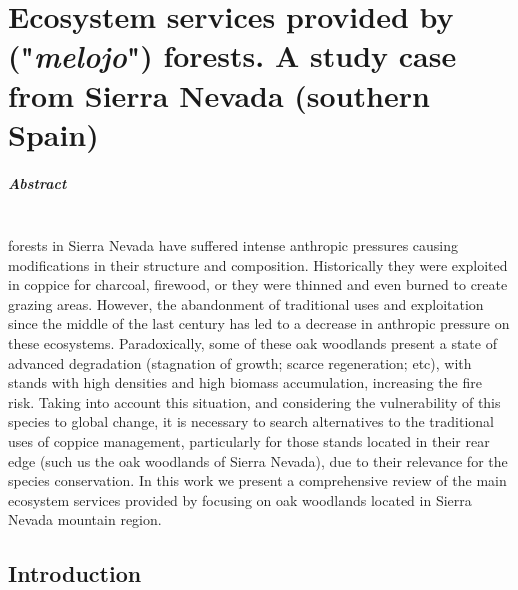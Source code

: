 %
\chapter{\textcolor{ctcolormain}{Ecosystem services provided by \Qpw ("\textit{melojo}") forests}. A study case from Sierra Nevada (southern Spain)}\label{sec:es}

\mbox{}
\vfill


\newpage

\paragraph{Abstract} \mbox{} \\
\Qp forests in Sierra Nevada have suffered intense anthropic pressures causing modifications in their structure and composition. Historically they were exploited in coppice for charcoal, firewood, or they were thinned and even burned to create grazing areas. However, the abandonment of traditional uses and exploitation since the middle of the last century has led to a decrease in anthropic pressure on these ecosystems. Paradoxically, some of these oak woodlands present a state of advanced degradation (stagnation of growth; scarce regeneration; etc), with stands with high densities and high biomass accumulation, increasing the fire risk. Taking into account this situation, and considering the vulnerability of this species to global change, it is necessary to search alternatives to the traditional uses of coppice management, particularly for those stands located in their rear edge (such us the oak woodlands of Sierra Nevada), due to their relevance for the species conservation. 
In this work we present a comprehensive review of the main ecosystem services provided by \Qpy focusing on oak woodlands located in Sierra Nevada mountain region.
\newpage

\section{Introduction}\label{sec:es:intro}

